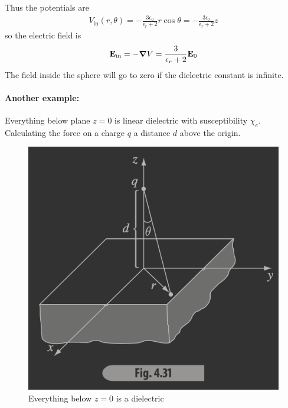 \documentclass[../main.tex]{subfiles}
\begin{document}
Thus the potentials are
\begin{align*}
    V_\text{in} (r, \theta) = -\frac{3\epsilon_0}{\epsilon_r + 2} r \cos\theta = -\frac{3\epsilon_0}{\epsilon_r + 2} z
\end{align*}
so the electric field is
\begin{align*}
    \vb E_\text{in} = -\grad V = \frac{3}{\epsilon_r + 2} \vb E_0
\end{align*}
The field inside the sphere will go to zero if the dielectric constant is infinite.

\paragraph{Another example:} Everything below plane $z = 0$ is linear dielectric with susceptibility $\chi_e$.
Calculating the force on a charge $q$ a distance $d$ above the origin.

\begin{figure}[ht]
    \centering
    \includegraphics[width=0.3\linewidth]{fig4_31.png}
    \caption{Everything below $z = 0$ is a dielectric}
    \label{fig:4_31}
\end{figure}
\end{document}

